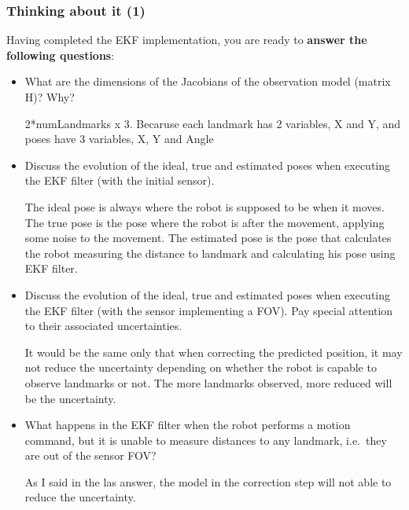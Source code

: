 \documentclass[11pt]{article}
\begin{document}
    \hypertarget{thinking-about-it-1}{%
\subsubsection{Thinking about it (1)}\label{thinking-about-it-1}}

Having completed the EKF implementation, you are ready to \textbf{answer
the following questions}:

\begin{itemize}
\item
  What are the dimensions of the Jacobians of the observation model
  (matrix H)? Why?

  2*numLandmarks x 3. Becaruse each landmark has 2 variables, X and Y,
  and poses have 3 variables, X, Y and Angle
\item
  Discuss the evolution of the ideal, true and estimated poses when
  executing the EKF filter (with the initial sensor).

  The ideal pose is always where the robot is supposed to be when it
  moves. The true pose is the pose where the robot is after the
  movement, applying some noise to the movement. The estimated pose is
  the pose that calculates the robot measuring the distance to landmark
  and calculating his pose using EKF filter.
\item
  Discuss the evolution of the ideal, true and estimated poses when
  executing the EKF filter (with the sensor implementing a FOV). Pay
  special attention to their associated uncertainties.

  It would be the same only that when correcting the predicted position,
  it may not reduce the uncertainty depending on whether the robot is
  capable to observe landmarks or not. The more landmarks observed, more
  reduced will be the uncertainty.
\item
  What happens in the EKF filter when the robot performs a motion
  command, but it is unable to measure distances to any landmark,
  i.e.~they are out of the sensor FOV?

  As I said in the las answer, the model in the correction step will not
  able to reduce the uncertainty.
\end{itemize}


    
    
    
\end{document}
